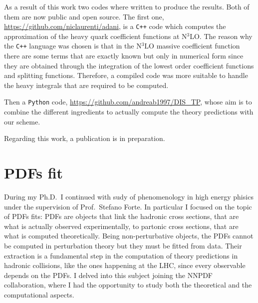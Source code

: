 \documentclass[11pt,a4paper]{moderncv}        %
\begin{document}
As a result of this work two codes where written to produce the results.
Both of them are now public and open source.
The first one, \url{https://github.com/niclaurenti/adani}, is a \texttt{C++} code 
which computes the approximation of the heavy quark coefficient functions at N$^3$LO.
The reason why the \texttt{C++} language was chosen is that in the N$^3$LO massive coefficient function there are some terms that are
exactly known but only in numerical form since they are obtained through the integration of the lowest order coefficient functions and
splitting functions.
Therefore, a compiled code was more suitable to handle the heavy integrals that are required to be computed.

Then a \texttt{Python} code, \url{https://github.com/andreab1997/DIS_TP}, whose aim is to combine the different ingredients to actually
compute the theory predictions with our scheme.

Regarding this work, a publication is in preparation.


\section{PDFs fit}

During my Ph.D.\ I continued with sudy of phenomenology in high energy phisics under the supervision of Prof.\ Stefano Forte.
In particular I focused on the topic of PDFs fits: PDFs are objects that link the hadronic cross sections,
that are what is actually observed experimentally, to partonic cross sections, that are what is computed theoretically.
Being non-perturbative objects, the PDFs cannot be computed in perturbation theory but they must be fitted from data.
Their extraction is a fundamental step in the computation of theory predictions in hadronic collisions, like the ones happening 
at the LHC, since every observable depends on the PDFs.
I delved into this subject joining the NNPDF collaboration, where I had the opportunity to study both the theoretical and the
computational aspects.
\end{document}
